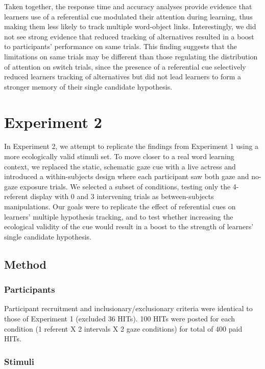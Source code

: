 \documentclass[12pt,]{article}
\begin{document}
Taken together, the response time and accuracy analyses provide evidence
that learners use of a referential cue modulated their attention during
learning, thus making them less likely to track multiple word-object
links. Interestingly, we did not see strong evidence that reduced
tracking of alternatives resulted in a boost to participants'
performance on same trials. This finding suggests that the limitations
on same trials may be different than those regulating the distribution
of attention on switch trials, since the presence of a referential cue
selectively reduced learners tracking of alternatives but did not lead
learners to form a stronger memory of their single candidate hypothesis.

\section{Experiment 2}\label{experiment-2}

In Experiment 2, we attempt to replicate the findings from Experiment 1
using a more ecologically valid stimuli set. To move closer to a real
word learning context, we replaced the static, schematic gaze cue with a
live actress and introduced a within-subjects design where each
participant saw both gaze and no-gaze exposure trials. We selected a
subset of conditions, testing only the 4-referent display with 0 and 3
intervening trials as between-subjects manipulations. Our goals were to
replicate the effect of referential cues on learners' multiple
hypothesis tracking, and to test whether increasing the ecological
validity of the cue would result in a boost to the strength of learners'
single candidate hypothesis.

\subsection{Method}\label{method-1}

\subsubsection{Participants}\label{participants-1}

Participant recruitment and inclusionary/exclusionary criteria were
identical to those of Experiment 1 (excluded 36 HITs). 100 HITs were
posted for each condition (1 referent X 2 intervals X 2 gaze conditions)
for total of 400 paid HITs.

\subsubsection{Stimuli}\label{stimuli-1}
\end{document}
